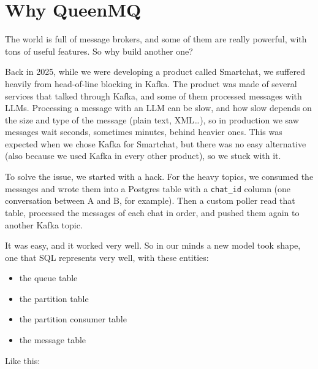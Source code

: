 
\section{Why QueenMQ}


The world is full of message brokers, and some of them are really powerful, with tons of useful
features. So why build another one?

Back in 2025, while we were developing a product called Smartchat, we suffered heavily from
head-of-line blocking in Kafka. The product was made of several services that talked through
Kafka, and some of them processed messages with LLMs. Processing a message with an LLM can be slow,
and how slow depends on the size and type of the message (plain text, XML\ldots), so in production
we saw messages wait seconds, sometimes minutes, behind heavier ones. This was expected when we
chose Kafka for Smartchat, but there was no easy alternative (also because we used Kafka in every
other product), so we stuck with it.

To solve the issue, we started with a hack. For the heavy topics, we consumed the messages and
wrote them into a Postgres table with a \texttt{chat\_id} column (one conversation between A and B,
for example). Then a custom poller read that table, processed the messages of each chat in order,
and pushed them again to another Kafka topic.

It was easy, and it worked very well. So in our minds a new model took shape, one that SQL
represents very well, with these entities:

\begin{itemize}
\tightlist
\item the queue table
\item the partition table
\item the partition consumer table
\item the message table
\end{itemize}

Like this:


